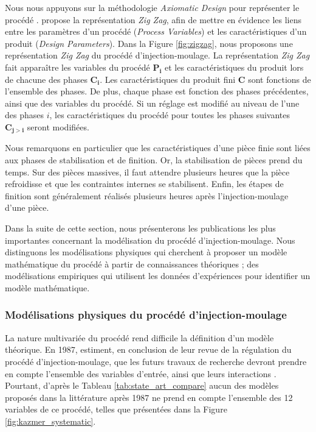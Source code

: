 Nous nous appuyons sur la méthodologie \textit{Axiomatic Design} pour représenter le procédé \cite{suh_principles_1990}.
\citeauthor{suh_principles_1990} propose la représentation \textit{Zig Zag}, afin de mettre en évidence les liens entre les paramètres d'un procédé (\textit{Process Variables}) et les caractéristiques d'un produit (\textit{Design Parameters}).
Dans la Figure \ref{fig:zigzag}, nous proposons une représentation \textit{Zig Zag} du procédé d'injection-moulage.
La représentation \textit{Zig Zag} fait apparaître les variables du procédé $\boldsymbol{P_i}$ et les caractéristiques du produit lors de chacune des phases $\boldsymbol{C_i}$.
Les caractéristiques du produit fini $\boldsymbol{C}$ sont fonctions de l’ensemble des phases.
De plus, chaque phase est fonction des phases précédentes, ainsi que des variables du procédé.
Si un réglage est modifié au niveau de l’une des phases $i$, les caractéristiques du procédé pour toutes les phases suivantes $\boldsymbol{C_{j>i}}$ seront modifiées.

Nous remarquons en particulier que les caractéristiques d'une pièce finie sont liées aux phases de stabilisation et de finition.
Or, la stabilisation de pièces prend du temps.
Sur des pièces massives, il faut attendre plusieurs heures que la pièce refroidisse et que les contraintes internes se stabilisent.
Enfin, les étapes de finition sont généralement réalisés plusieurs heures après l'injection-moulage d'une pièce.

Dans la suite de cette section, nous présenterons les publications les plus importantes concernant la modélisation du procédé d'injection-moulage.
Nous distinguons les modélisations physiques qui cherchent à proposer un modèle mathématique du procédé à partir de connaissances théoriques ; des modélisations empiriques qui utilisent les données d'expériences pour identifier un modèle mathématique.


\subsubsection{Modélisations physiques du procédé d'injection-moulage} \label{subsubsec:molding_theory}
La nature multivariée du procédé rend difficile la définition d'un modèle théorique.
En 1987, \citeauthor{agrawal_injection-molding_1987} estiment, en conclusion de leur revue de la régulation du procédé d'injection-moulage, que les futurs travaux de recherche devront prendre en compte l’ensemble des variables d'entrée, ainsi que leurs interactions \cite{agrawal_injection-molding_1987}.
Pourtant, d'après le Tableau \ref{tab:state_art_compare} aucun des modèles proposés dans la littérature après 1987 ne prend en compte l'ensemble des 12 variables de ce procédé, telles que présentées dans la Figure \ref{fig:kazmer_systematic}.

